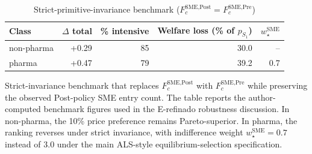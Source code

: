 \begin{table}[htbp]
\centering
\begin{threeparttable}
\caption{Strict-primitive-invariance benchmark ($F_c^{\text{SME,Post}} = F_c^{\text{SME,Pre}}$)}
\label{tab:v3_strict_invariance}
\small
\begin{tabular}{lrrrr}
\toprule
Class & $\Delta$ total & \% intensive & Welfare loss (\% of $p_{S_1}$) & $w^{\text{SME}}_\star$ \\
\midrule
non-pharma & +0.29 & 85 & 30.0 & -- \\
pharma & +0.47 & 79 & 39.2 & 0.7 \\
\bottomrule
\end{tabular}
\begin{tablenotes}\footnotesize
\item Strict-invariance benchmark that replaces $F_c^{\text{SME,Post}}$
with $F_c^{\text{SME,Pre}}$ while preserving the observed Post-policy
SME entry count. The table reports the author-computed benchmark
figures used in the E-refinado robustness discussion. In non-pharma,
the 10\% price preference remains Pareto-superior. In pharma, the
ranking reverses under strict invariance, with indifference weight
$w^{\text{SME}}_\star = 0.7$ instead of 3.0 under the main ALS-style
equilibrium-selection specification.
\end{tablenotes}
\end{threeparttable}
\end{table}

